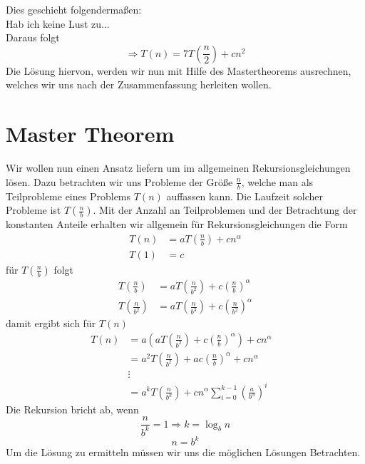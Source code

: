 \documentclass[a4paper,twoside,10pt]{report}
\begin{document}
Dies geschieht folgendermaßen:\\
Hab ich keine Lust zu...\\
Daraus folgt
$$\Rightarrow T(n)=7T\left(\frac{n}{2}\right)+cn^2$$
Die Lösung hiervon, werden wir nun mit Hilfe des Mastertheorems ausrechnen, welches wir uns nach der Zusammenfassung herleiten wollen.
\section{Master Theorem}
Wir wollen nun einen Ansatz liefern um im allgemeinen Rekursionsgleichungen lösen.
Dazu betrachten wir uns Probleme der Größe $\frac{n}{b}$, welche man als Teilprobleme eines Problems $T(n)$ auffassen kann.
Die Laufzeit solcher Probleme ist $T\left(\frac{n}{b}\right)$.
Mit der Anzahl an Teilproblemen und der Betrachtung der konstanten Anteile erhalten wir allgemein für Rekursionsgleichungen die Form
\begin{align*}
T(n)&=aT\left(\frac{n}{b}\right)+cn^\alpha\\
T(1)&=c
\end{align*}
für $T\left(\frac{n}{b}\right)$ folgt
\begin{align*}
T\left(\frac{n}{b}\right)&=aT\left(\frac{n}{b^2}\right)+c\left(\frac{n}{b}\right)^\alpha\\
T\left(\frac{n}{b^2}\right)&=aT\left(\frac{n}{b^3}\right)+c\left(\frac{n}{b^2}\right)^\alpha
\end{align*}
damit ergibt sich für $T(n)$
\begin{align*}
T(n)&=a(aT\left(\frac{n}{b^2}\right)+c\left(\frac{n}{b}\right)^\alpha)+cn^\alpha\\
&=a^2T\left(\frac{n}{b^2}\right)+ac\left(\frac{n}{b}\right)^\alpha+cn^\alpha\\
&\vdots&\\
&=a^kT\left(\frac{n}{b^k}\right)+cn^\alpha\sum_{i=0}^{k-1}\left(\frac{a}{b^\alpha}\right)^i
\end{align*}
Die Rekursion bricht ab, wenn
$$\frac{n}{b^k}=1\Rightarrow k=\log_bn$$
$$n=b^k$$
Um die Lösung zu ermitteln müssen wir uns die möglichen Lösungen Betrachten.\\[.5em]
\\[.5em]
\end{document}
